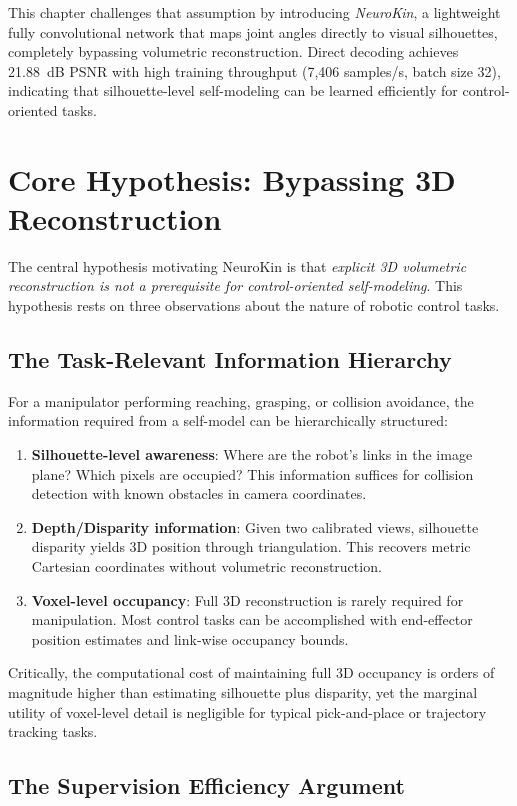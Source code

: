 \documentclass[12pt,a4paper,oneside]{report}
\begin{document}
This chapter challenges that assumption by introducing \textit{NeuroKin}, a lightweight fully convolutional network that maps joint angles directly to visual silhouettes, completely bypassing volumetric reconstruction. Direct decoding achieves 21.88~dB PSNR with high training throughput (7,406 samples/s, batch size 32), indicating that silhouette-level self-modeling can be learned efficiently for control-oriented tasks.
\section{Core Hypothesis: Bypassing 3D Reconstruction}

The central hypothesis motivating NeuroKin is that \textit{explicit 3D volumetric reconstruction is not a prerequisite for control-oriented self-modeling}. This hypothesis rests on three observations about the nature of robotic control tasks.
\subsection{The Task-Relevant Information Hierarchy}
\label{subsec:the_task_relevant_information_hierarchy}

For a manipulator performing reaching, grasping, or collision avoidance, the information required from a self-model can be hierarchically structured:
\begin{enumerate}
    \item \textbf{Silhouette-level awareness}: Where are the robot's links in the image plane? Which pixels are occupied? This information suffices for collision detection with known obstacles in camera coordinates.
    \item \textbf{Depth/Disparity information}: Given two calibrated views, silhouette disparity yields 3D position through triangulation. This recovers metric Cartesian coordinates without volumetric reconstruction.
    \item \textbf{Voxel-level occupancy}: Full 3D reconstruction is rarely required for manipulation. Most control tasks can be accomplished with end-effector position estimates and link-wise occupancy bounds.
\end{enumerate}

Critically, the computational cost of maintaining full 3D occupancy is orders of magnitude higher than estimating silhouette plus disparity, yet the marginal utility of voxel-level detail is negligible for typical pick-and-place or trajectory tracking tasks.
\subsection{The Supervision Efficiency Argument}
\label{subsec:the_supervision_efficiency_argument}
\end{document}
